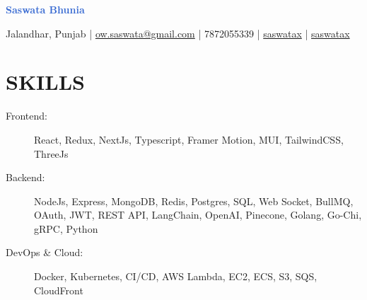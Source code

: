 \documentclass[]{resume}
\begin{document}
\textrm{\Huge\textcolor{highlight}{\textbf{Saswata Bhunia}}}
\vspace{.4em}

Jalandhar, Punjab | \href{mailto:ow.saswata@gmail.com}{ow.saswata@gmail.com} | 7872055339 | \href{https://www.linkedin.com/in/saswatax}{\faLinkedin \space saswatax} | \href{https://github.com/saswatax}{\faGithub \space saswatax}
\vspace{.4em}


\section{SKILLS}
\begin{description}
  \item[Frontend:] React, Redux, NextJs, Typescript, Framer Motion, MUI, TailwindCSS, ThreeJs 
  \item[Backend:] NodeJs, Express, MongoDB, Redis, Postgres, SQL, Web Socket, BullMQ, OAuth, JWT, REST API, LangChain, OpenAI, Pinecone, Golang, Go-Chi, gRPC, Python
  \item[DevOps \& Cloud:] Docker, Kubernetes, CI/CD, AWS Lambda, EC2, ECS, S3, SQS, CloudFront
\end{description}
\end{document}
